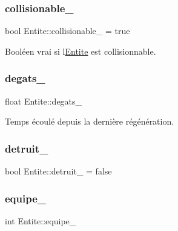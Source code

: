 \subsubsection{\texorpdfstring{collisionable\+\_\+}{collisionable\_}}
{\footnotesize\ttfamily bool Entite\+::collisionable\+\_\+ = true\hspace{0.3cm}{\ttfamily [protected]}}



Booléen vrai si l\textquotesingle{}\hyperlink{class_entite}{Entite} est collisionnable. 

\mbox{\label{class_entite_ac453832772daef8dc6eae431358a8e2a}} 
\subsubsection{\texorpdfstring{degats\+\_\+}{degats\_}}
{\footnotesize\ttfamily float Entite\+::degats\+\_\+\hspace{0.3cm}{\ttfamily [protected]}}



Temps écoulé depuis la dernière régénération. 

\mbox{\label{class_entite_a2d98d6fac9fb85da156fcda84fcec3ac}} 
\subsubsection{\texorpdfstring{detruit\+\_\+}{detruit\_}}
{\footnotesize\ttfamily bool Entite\+::detruit\+\_\+ = false\hspace{0.3cm}{\ttfamily [protected]}}

\mbox{\label{class_entite_a86f42758a3e4672052331b7a4daa10b5}} 
\subsubsection{\texorpdfstring{equipe\+\_\+}{equipe\_}}
{\footnotesize\ttfamily int Entite\+::equipe\+\_\+\hspace{0.3cm}{\ttfamily [protected]}}



